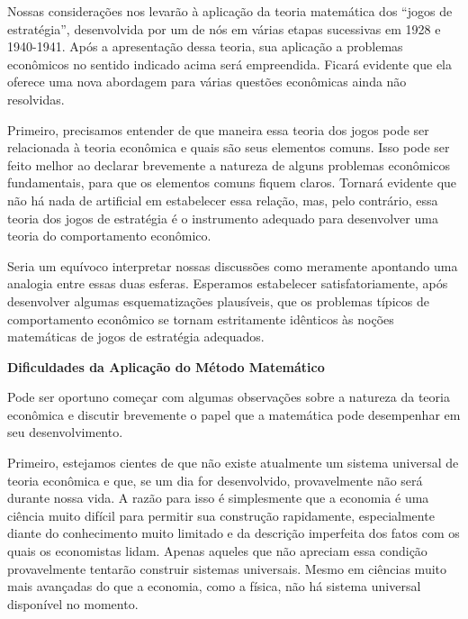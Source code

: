 \documentclass[12pt]{article}
\begin{document}
Nossas considerações nos levarão à aplicação da teoria matemática dos “jogos de estratégia”, desenvolvida por um de nós em várias etapas sucessivas em 1928 e 1940-1941. Após a apresentação dessa teoria, sua aplicação a problemas econômicos no sentido indicado acima será empreendida. Ficará evidente que ela oferece uma nova abordagem para várias questões econômicas ainda não resolvidas.

Primeiro, precisamos entender de que maneira essa teoria dos jogos pode ser relacionada à teoria econômica e quais são seus elementos comuns. Isso pode ser feito melhor ao declarar brevemente a natureza de alguns problemas econômicos fundamentais, para que os elementos comuns fiquem claros. Tornará evidente que não há nada de artificial em estabelecer essa relação, mas, pelo contrário, essa teoria dos jogos de estratégia é o instrumento adequado para desenvolver uma teoria do comportamento econômico.

Seria um equívoco interpretar nossas discussões como meramente apontando uma analogia entre essas duas esferas. Esperamos estabelecer satisfatoriamente, após desenvolver algumas esquematizações plausíveis, que os problemas típicos de comportamento econômico se tornam estritamente idênticos às noções matemáticas de jogos de estratégia adequados.

\textbf{Dificuldades da Aplicação do Método Matemático}


Pode ser oportuno começar com algumas observações sobre a natureza da teoria econômica e discutir brevemente o papel que a matemática pode desempenhar em seu desenvolvimento.

Primeiro, estejamos cientes de que não existe atualmente um sistema universal de teoria econômica e que, se um dia for desenvolvido, provavelmente não será durante nossa vida. A razão para isso é simplesmente que a economia é uma ciência muito difícil para permitir sua construção rapidamente, especialmente diante do conhecimento muito limitado e da descrição imperfeita dos fatos com os quais os economistas lidam. Apenas aqueles que não apreciam essa condição provavelmente tentarão construir sistemas universais. Mesmo em ciências muito mais avançadas do que a economia, como a física, não há sistema universal disponível no momento.
\end{document}
